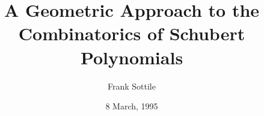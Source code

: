 %
%
%



\addtolength{\evensidemargin}{-.6in}\addtolength{\oddsidemargin}{-.6in}
\addtolength{\textwidth}{1.2in}

\newtheorem{lemma}{Lemma}
\newtheorem{thm}[lemma]{Theorem}
\newtheorem{prop}[lemma]{Proposition}
\newtheorem{cor}[lemma]{Corollary}
\newtheorem{example}[lemma]{Example}
\newtheorem{conjecture}[lemma]{Conjecture}



\newcommand{\Edot}{{E\!_{\mbox{\Huge $.$}}}\!}
\newcommand{\Fdot}{{F\!\!_{\mbox{\Huge $.$}}}}
\newcommand{\Fpdot}{{{F\!\!_{\mbox{\Huge $.$}}}\!'}}
\newcommand{\Gdot}{{G\!_{\mbox{\Huge $.$}}}\!}
\newcommand{\Gpdot}{{G\!_{\mbox{\Huge $.$}}}\!'\!}
\newcommand{\llra}{\relbar\joinrel\relbar\joinrel\longrightarrow}
\newcommand{\lllra}{\relbar\joinrel\llra}
\newcommand{\Span}{\mbox{span}}

\newcommand{\rkm}{\stackrel{r[k,m]}{\llra}}
\newcommand{\ckm}{\stackrel{c[k,m]}{\llra}}

\newcommand{\QED}{
\setlength{\unitlength}{1.0pt}%
\begin{picture}(7.5,7.5)
\put(0,-2.5){\rule{2.5pt}{2.5pt}}
\put(0,0){\rule{5pt}{2.5pt}}
\put(0,2.5){\rule{7.5pt}{2.5pt}}
\end{picture}\vspace{10pt}}





\mbox{ }\vspace{-10pt}

\title[Combinatorics of Schubert Polynomials]{A 
Geometric Approach to the Combinatorics of Schubert Polynomials}

\author{Frank Sottile}
\address{Department of Mathematics\\
        University of Toronto\\
        100 St.~George Street\\
        Toronto, Ontario  M5S 3G3\\
        Canada\\
        (416) 978-4031}
\date{8 March, 1995}

